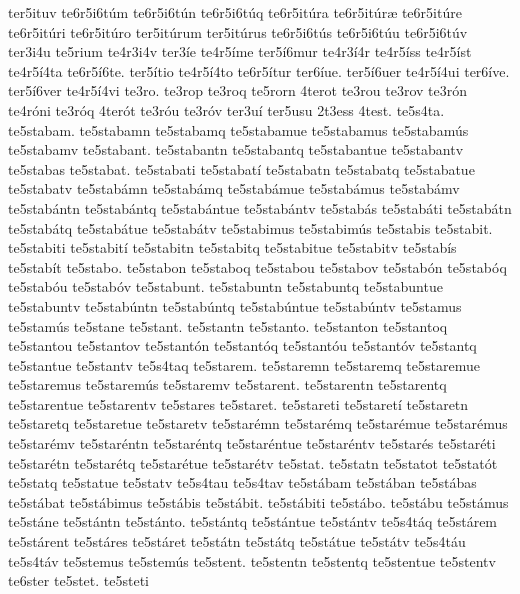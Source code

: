{ter5ituv
te6r5i6t^^fam
te6r5i6t^^fan
te6r5i6t^^faq
te6r5it^^fara
te6r5it^^far^^e6
te6r5it^^fare
te6r5it^^fari
te6r5it^^faro
ter5it^^farum
ter5it^^farus
te6r5i6t^^fas
te6r5i6t^^fau
te6r5i6t^^fav
ter3i4u
te5rium
te4r3i4v
ter3^^ede
te4r5^^edme
ter5^^ed6mur
te4r3^^ed4r
te4r5^^edss
te4r5^^edst
te4r5^^ed4ta
te6r5^^ed6te.
ter5^^edtio
te4r5^^ed4to
te6r5^^edtur
ter6^^edue.
ter5^^ed6uer
te4r5^^ed4ui
ter6^^edve.
ter5^^ed6ver
te4r5^^ed4vi
te3ro.
te3rop
te3roq
te5rorn
4terot
te3rou
te3rov
te3r^^f3n
te4r^^f3ni
te3r^^f3q
4ter^^f3t
te3r^^f3u
te3r^^f3v
ter3u^^ed
ter5usu
2t3ess
4test.
te5s4ta.
te5stabam.
te5stabamn
te5stabamq
te5stabamue
te5stabamus
te5stabam^^fas
te5stabamv
te5stabant.
te5stabantn
te5stabantq
te5stabantue
te5stabantv
te5stabas
te5stabat.
te5stabati
te5stabat^^ed
te5stabatn
te5stabatq
te5stabatue
te5stabatv
te5stab^^e1mn
te5stab^^e1mq
te5stab^^e1mue
te5stab^^e1mus
te5stab^^e1mv
te5stab^^e1ntn
te5stab^^e1ntq
te5stab^^e1ntue
te5stab^^e1ntv
te5stab^^e1s
te5stab^^e1ti
te5stab^^e1tn
te5stab^^e1tq
te5stab^^e1tue
te5stab^^e1tv
te5stabimus
te5stabim^^fas
te5stabis
te5stabit.
te5stabiti
te5stabit^^ed
te5stabitn
te5stabitq
te5stabitue
te5stabitv
te5stab^^eds
te5stab^^edt
te5stabo.
te5stabon
te5staboq
te5stabou
te5stabov
te5stab^^f3n
te5stab^^f3q
te5stab^^f3u
te5stab^^f3v
te5stabunt.
te5stabuntn
te5stabuntq
te5stabuntue
te5stabuntv
te5stab^^fantn
te5stab^^fantq
te5stab^^fantue
te5stab^^fantv
te5stamus
te5stam^^fas
te5stane
te5stant.
te5stantn
te5stanto.
te5stanton
te5stantoq
te5stantou
te5stantov
te5stant^^f3n
te5stant^^f3q
te5stant^^f3u
te5stant^^f3v
te5stantq
te5stantue
te5stantv
te5s4taq
te5starem.
te5staremn
te5staremq
te5staremue
te5staremus
te5starem^^fas
te5staremv
te5starent.
te5starentn
te5starentq
te5starentue
te5starentv
te5stares
te5staret.
te5stareti
te5staret^^ed
te5staretn
te5staretq
te5staretue
te5staretv
te5star^^e9mn
te5star^^e9mq
te5star^^e9mue
te5star^^e9mus
te5star^^e9mv
te5star^^e9ntn
te5star^^e9ntq
te5star^^e9ntue
te5star^^e9ntv
te5star^^e9s
te5star^^e9ti
te5star^^e9tn
te5star^^e9tq
te5star^^e9tue
te5star^^e9tv
te5stat.
te5statn
te5statot
te5stat^^f3t
te5statq
te5statue
te5statv
te5s4tau
te5s4tav
te5st^^e1bam
te5st^^e1ban
te5st^^e1bas
te5st^^e1bat
te5st^^e1bimus
te5st^^e1bis
te5st^^e1bit.
te5st^^e1biti
te5st^^e1bo.
te5st^^e1bu
te5st^^e1mus
te5st^^e1ne
te5st^^e1ntn
te5st^^e1nto.
te5st^^e1ntq
te5st^^e1ntue
te5st^^e1ntv
te5s4t^^e1q
te5st^^e1rem
te5st^^e1rent
te5st^^e1res
te5st^^e1ret
te5st^^e1tn
te5st^^e1tq
te5st^^e1tue
te5st^^e1tv
te5s4t^^e1u
te5s4t^^e1v
te5stemus
te5stem^^fas
te5stent.
te5stentn
te5stentq
te5stentue
te5stentv
te6ster
te5stet.
te5steti
}
